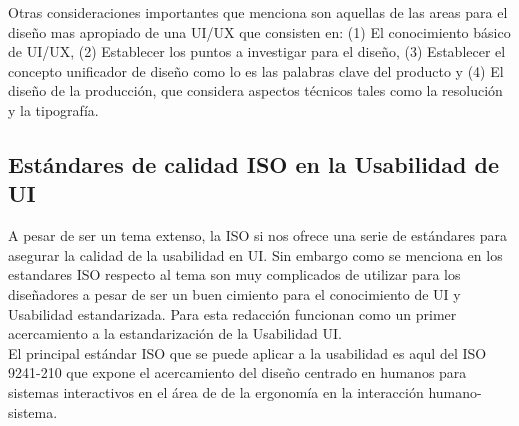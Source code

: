 Otras consideraciones importantes que \cite{joo-2017}  %
menciona son aquellas de las areas para el diseño mas apropiado de una UI/UX que consisten en:
(1) El conocimiento básico de UI/UX, (2) Establecer los puntos a investigar para el diseño,
(3) Establecer el concepto unificador de diseño como lo es las palabras clave del producto y
(4) El diseño de la producción, que considera aspectos técnicos tales como la resolución y la tipografía.

\subsection{Estándares de calidad ISO en la Usabilidad de UI}
A pesar de ser un tema extenso, la ISO si nos ofrece una serie de estándares para asegurar
la calidad de la usabilidad en UI. Sin embargo como se menciona en \cite{bevan-2009} %
los estandares ISO respecto al tema son muy complicados de utilizar para los diseñadores a pesar
de ser un buen cimiento para el conocimiento de UI y Usabilidad estandarizada. Para esta redacción
funcionan como un primer acercamiento a la estandarización de la Usabilidad UI.
\\

El principal estándar ISO que se puede aplicar a la usabilidad es aqul del ISO 9241-210 \cite{internation-organization-for-standardization-2019} %
que expone el acercamiento del diseño centrado en humanos para sistemas interactivos en el área de
de la ergonomía en la interacción humano-sistema. 

